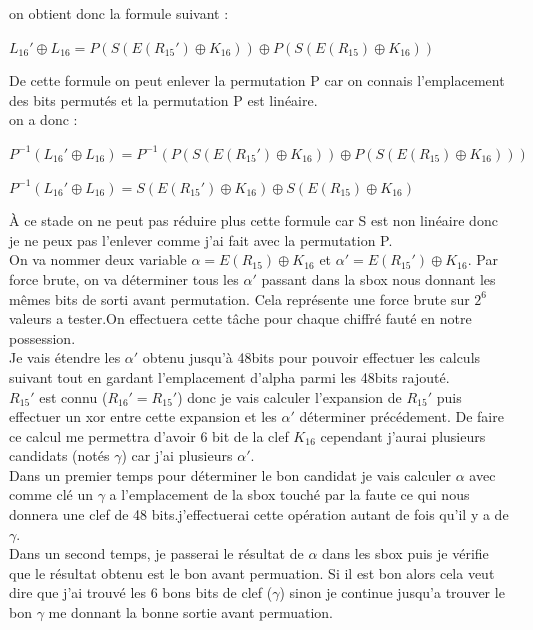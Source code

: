 \documentclass[a4paper,10pt]{report}
\begin{document}
			\newpage
			on obtient donc la formule suivant :
			\begin{center}$L_{16}'\oplus L_{16} = P(S(E(R_{15}')\oplus K_{16}))\oplus P(S(E(R_{15})\oplus K_{16})) $\end{center}
			
			De cette formule on peut enlever la permutation P car on connais l'emplacement des bits permutés et la permutation P est linéaire.\\
			on a donc :
			\begin{center}$P^{-1}(L_{16}'\oplus L_{16}) =P^{-1}( P(S(E(R_{15}')\oplus K_{16}))\oplus P(S(E(R_{15})\oplus K_{16}))) $\end{center}
			\begin{center}$P^{-1}(L_{16}'\oplus L_{16}) =S(E(R_{15}')\oplus K_{16})\oplus S(E(R_{15})\oplus K_{16}) $\end{center}
			
			À ce stade on ne peut pas réduire plus cette formule car S est non linéaire donc je ne peux pas l'enlever comme j'ai fait avec la permutation P.\\
			On va nommer deux variable $\alpha = E(R_{15})\oplus K_{16}$ et $\alpha' = E(R_{15}')\oplus K_{16}$.
			Par force brute, on va déterminer tous les $\alpha'$ passant dans la sbox nous donnant les mêmes bits de sorti avant permutation. Cela représente une force brute sur $2^{6}$valeurs a tester.On effectuera cette tâche pour chaque chiffré fauté en notre possession.\\
			Je vais étendre les $\alpha'$ obtenu jusqu'à 48bits pour pouvoir effectuer les calculs suivant tout en gardant l'emplacement d'alpha parmi les 48bits rajouté.\\
			$R_{15}'$ est connu ($R_{16}'=R_{15}'$) donc je vais calculer l'expansion de $R_{15}'$ puis effectuer un xor entre cette expansion et les $\alpha'$ déterminer précédement. De faire ce calcul me permettra d'avoir 6 bit de la clef $K_{16}$ cependant j'aurai plusieurs candidats (notés $\gamma$) car j'ai plusieurs $\alpha'$.\\
			Dans un premier temps pour déterminer le bon candidat je vais calculer $\alpha$ avec comme clé un $\gamma$ a l'emplacement de la sbox touché par la faute ce qui nous donnera une clef de 48 bits.j'effectuerai cette opération autant de fois qu'il y a de $\gamma$.\\
			Dans un second temps, je passerai le résultat de $\alpha$ dans les sbox puis je vérifie que le résultat obtenu est le bon avant permuation. Si il est bon alors cela veut dire que j'ai trouvé les 6 bons bits de clef ($\gamma$) sinon je continue jusqu'a trouver le bon $\gamma$ me donnant la bonne sortie avant permuation.\\
			
\end{document}
